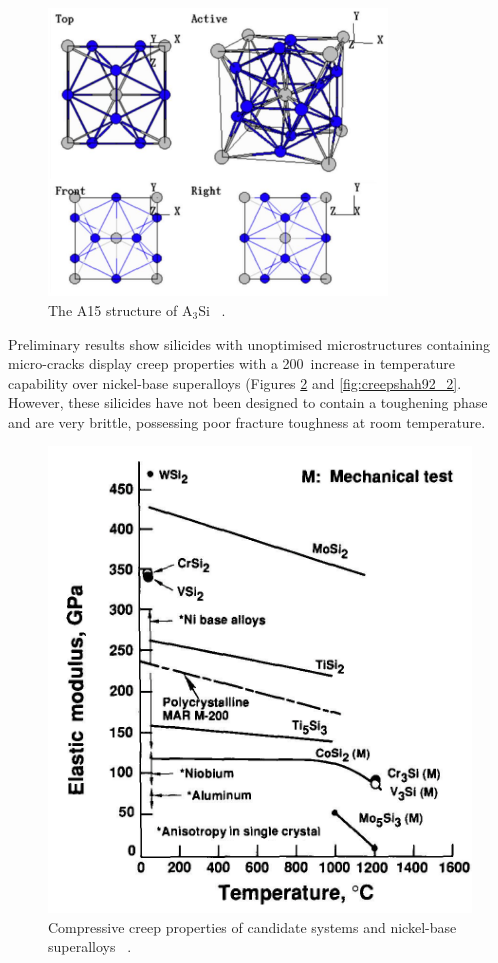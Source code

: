 %
\begin{figure}[H]
\begin{center}
\includegraphics[width=9cm]{A15}
\caption{The A15 structure of A$_3$Si ~\cite{nevitt95}.}\label{fig:A15}
\end{center}
\end{figure}
Preliminary results show silicides with unoptimised microstructures containing micro-cracks display creep properties with a 200\celsius\ increase in temperature capability over nickel-base superalloys (Figures \ref{fig:creepshah92_1} and \ref{fig:creepshah92_2}.  However, these silicides have not been designed to contain a toughening phase and are very brittle, possessing poor fracture toughness at room temperature. 
%
\begin{figure}[H]
\begin{center}
\includegraphics[width=.6\textwidth]{creepshah92_1}
\vspace{-.3cm}
\caption{Compressive creep properties of candidate systems and nickel-base superalloys ~\cite{shah92}.}\label{fig:creepshah92_1}
\end{center}
\end{figure}
